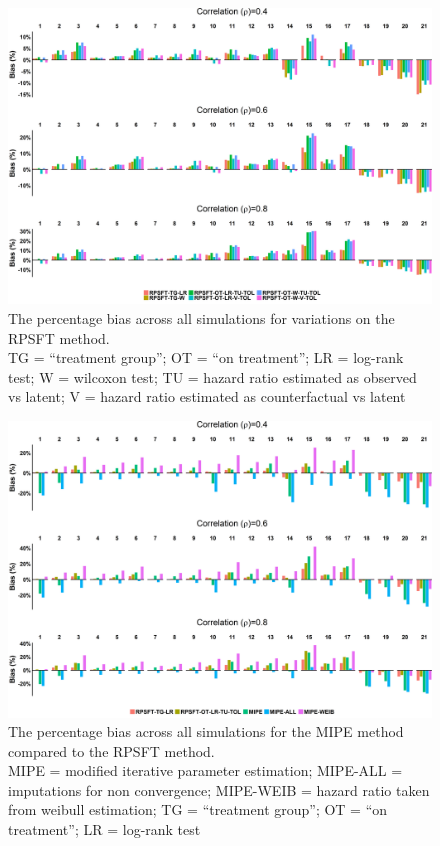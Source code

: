 \begin{figure}
    \centering
    \includegraphics[width=20cm]{images/app_allres/rpsft_bias4.png}
    \caption{The percentage bias across all simulations for variations on the RPSFT method. \\ TG = ``treatment group''; OT = ``on treatment''; LR = log-rank test; W = wilcoxon test; TU = hazard ratio estimated as observed vs latent; V = hazard ratio estimated as counterfactual vs latent}
    \label{F:allp:rpsft}
\end{figure}

\begin{figure}
    \centering
    \includegraphics[width=20cm]{images/app_allres/mipe_bias4.png}
    \caption{The percentage bias across all simulations for the MIPE method compared to the RPSFT method. \\ MIPE = modified iterative parameter estimation; MIPE-ALL = imputations for non convergence; MIPE-WEIB = hazard ratio taken from weibull estimation;  TG = ``treatment group''; OT = ``on treatment''; LR = log-rank test}
    \label{F:allp:mipe}
\end{figure}

